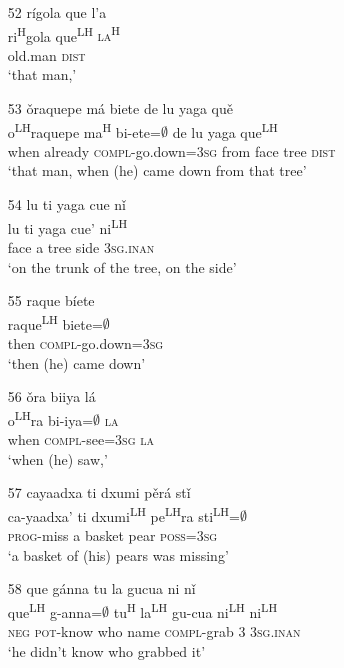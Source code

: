 \begin{itemize}
\item[52]
\glll r\'{i}gola que l'{a} \\
ri\textsuperscript{H}gola que\textsuperscript{LH} \textsc{la\textsuperscript{H}} \\
old.man \textsc{dist}  \\
\glt `that man,'


\item[53]
\glll \v{o}raquepe m\'{a} biete de lu yaga qu\v{e} \\
o\textsuperscript{LH}raquepe ma\textsuperscript{H} bi-ete=$\emptyset$ de lu yaga que\textsuperscript{LH} \\
when already \textsc{compl}-go.down=\textsc{3sg} from face tree \textsc{dist} \\
\glt `that man, when (he) came down from that tree'


\item[54]
\glll lu ti yaga cue n\v{i} \\
lu ti yaga cue' ni\textsuperscript{LH}\\
face a tree side \textsc{3sg.inan} \\
\glt `on the trunk of the tree, on the side'


\item[55]
\glll raque b\'{i}ete \\
raque\textsuperscript{LH}  biete=$\emptyset$  \\
then \textsc{compl}-go.down=\textsc{3sg}  \\
\glt `then (he) came down'


\item[56]
\glll \v{o}ra biiya l\'{a} \\
o\textsuperscript{LH}ra bi-iya=$\emptyset$ \textsc{la} \\
when \textsc{compl}-see=\textsc{3sg} \textsc{la}  \\
\glt  `when (he) saw,'


\item[57]
\glll cayaadxa ti dxumi p\v{e}r\'{a} st\v{i} \\
ca-yaadxa' ti dxumi\textsuperscript{LH} pe\textsuperscript{LH}ra sti\textsuperscript{LH}=$\emptyset$ \\
\textsc{prog}-miss a basket pear \textsc{poss}=\textsc{3sg} \\
\glt  `a basket of (his) pears was missing'


\item[58]
\glll que g\'{a}nna tu la gucua ni n\v{i} \\
que\textsuperscript{LH} g-anna=$\emptyset$ tu\textsuperscript{H} la\textsuperscript{LH} gu-cua ni\textsuperscript{LH} ni\textsuperscript{LH} \\
\textsc{neg} \textsc{pot}-know who name \textsc{compl}-grab \textsc{3} \textsc{3sg.inan} \\
\glt `he didn't know who grabbed it'



\end{itemize}
